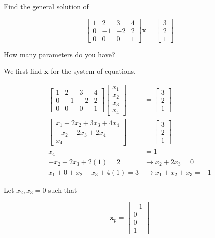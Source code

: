 \item[3.8] Find the general solution of

\begin{equation*}
 \begin{bmatrix}
  1 & 2 & 3 & 4\\
  0 & -1 & -2 & 2\\
  0 & 0 & 0 & 1
 \end{bmatrix}
\mathbf{x}=
\begin{bmatrix}
 3\\
 2\\
 1
\end{bmatrix}
\end{equation*}

How many parameters do you have?

We first find $\mathbf{x}$ for the system of equations.

\begin{align*}
  \begin{bmatrix}
  1 & 2 & 3 & 4\\
  0 & -1 & -2 & 2\\
  0 & 0 & 0 & 1
 \end{bmatrix}
\begin{bmatrix}
 x_1 \\x_2 \\x_3 \\x_4
\end{bmatrix}
&=
\begin{bmatrix}
 3\\
 2\\
 1
\end{bmatrix}\\
\begin{bmatrix}
 x_1 + 2 x_2 + 3 x_3 + 4 x_4 \\
 - x_2 -2 x_3 +2 x_4\\
 x_4
\end{bmatrix}
&= \begin{bmatrix}
 3\\
 2\\
 1
\end{bmatrix}\\
x_4 &= 1 \\
- x_2 -2 x_3 +2 (1) = 2 & \rightarrow x_2 + 2 x_3 = 0\\
x_1 + 0 + x_2 +  x_3 + 4 (1) = 3 & \rightarrow x_1 +x_2 +x_3 =-1
\end{align*}

Let $x_2, x_3 = 0$ such that

\begin{equation*}
 \mathbf{x}_p = \begin{bmatrix} -1 \\ 0 \\0 \\1 \end{bmatrix}
\end{equation*}


